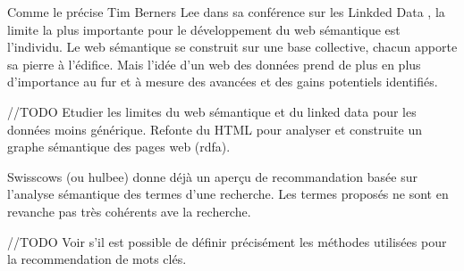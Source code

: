 \documentclass[12pt]{article}
\begin{document}
Comme le précise Tim Berners Lee dans sa conférence sur les Linkded Data \cite{tim-ted}, la limite la plus importante pour le développement du web sémantique est l'individu. Le web sémantique se construit sur une base collective, chacun apporte sa pierre à l'édifice. Mais l'idée d'un web des données prend de plus en plus d'importance au fur et à mesure des avancées et des gains potentiels identifiés.

//TODO Etudier les limites du web sémantique et du linked data pour les données moins générique. Refonte du HTML pour analyser et construite un graphe sémantique des pages web (rdfa).

Swisscows (ou hulbee) donne déjà un aperçu de recommandation basée sur l'analyse sémantique des termes d'une recherche. Les termes proposés ne sont en revanche pas très cohérents ave la recherche.

//TODO Voir s'il est possible de définir précisément les méthodes utilisées pour la recommendation de mots clés.

\clearpage

\printbibliography[
heading=bibintoc,
title={Bibliographie}
]
\end{document}
